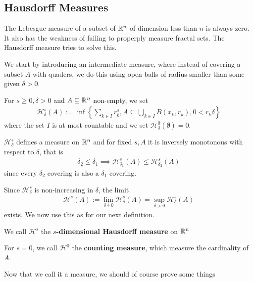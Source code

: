 \subsection{Hausdorff Measures}
The Lebesgue measure of a subset of $\mathbb{R}^{n}$ of dimension less than $n$ is always zero.
It also has the weakness of failing to properply measure fractal sets.
The Hausdorff measure tries to solve this.

We start by introducing an intermediate measure, where instead of covering a subset $A$ with quaders, we do this using open balls of radius smaller than some given $\delta >0 $.
\begin{dfn}[]
For $s \geq 0, \delta > 0$ and $A \subseteq \mathbb{R}^{n}$ non-empty, we set
\begin{align*}
  \mathcal{H}_{\delta}^{s}(A) := \inf \left\{
    \sum_{k \in I}r_k^{s}, A \subseteq \bigcup_{k \in I}B(x_k,r_k), 0< r_k \delta
  \right\}
\end{align*}
where the set $I$ is at most countable and we set $\mathcal{H}_{\delta}^{0}(\emptyset) = 0$.
\end{dfn}

\begin{rem}[]
  $\mathcal{H}_{\delta}^{s}$ defines a measure on $\mathbb{R}^{n}$ and for fixed $s,A$ it is inversely monotonous with respect to $\delta$, that is
  \begin{align*}
    \delta_2 \leq \delta_1 \implies \mathcal{H}_{\delta_1}^{s}(A) \leq \mathcal{H}_{\delta_2}^{s}(A)
  \end{align*}
  since every $\delta_2$ covering is also a $\delta_1$ covering.
\end{rem}
Since $\mathcal{H}_{\delta}^{s}$ is non-increasing in $\delta$, the limit
\begin{align*}
  \mathcal{H}^{s}(A) := \lim_{\delta \downarrow 0} \mathcal{H}_{\delta}^{s}(A) = \sup_{\delta > 0}\mathcal{H}_{\delta}^{s}(A)
\end{align*}
exists. We now use this as for our next definition.

\begin{dfn}[]
We call $\mathcal{H}^{s}$ the \textbf{$s$-dimensional Hausdorff measure} on $\mathbb{R}^{n}$
\end{dfn}
For $s = 0$, we call $\mathcal{H}^{0}$ the \textbf{counting measure}, which measure the cardinality of $A$.

Now that we call it a measure, we should of course prove some things


